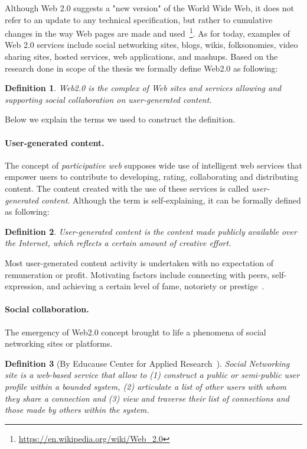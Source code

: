\documentclass[ngerman,UKenglish,table]{scrbook}
\newtheorem{definition}{Definition}
\begin{document}
Although Web 2.0 suggests a "new version" of the World Wide Web, it does not refer to an update to any technical specification, but rather to cumulative changes in the way Web pages are made and used~\footnote{\url{https://en.wikipedia.org/wiki/Web_2.0}}.
As for today, examples of Web 2.0 services include social networking sites, blogs, wikis, folksonomies, video sharing sites, hosted services, web applications, and mashups.
Based on the research done in scope of the thesis we formally define Web2.0 as following:
\begin{definition}
Web2.0 is the complex of Web sites and services allowing and supporting social collaboration on user-generated content.
\end{definition}

Below we explain the terms we used to construct the definition.

\paragraph{User-generated content.} 
The concept of \emph{participative web} supposes wide use of intelligent web services that empower users to contribute to developing, rating, collaborating and distributing content.
The content created with the use of these services is called \emph{user-generated content}. 
Although the term is self-explaining, it can be formally defined as following:
\begin{definition}User-generated content is the content made publicly available over the Internet, which reflects a certain amount of creative effort.
\end{definition}

Most user-generated content activity is undertaken with no expectation of
remuneration or profit.
Motivating factors include connecting with peers, self-expression, and achieving a certain level of fame, notoriety or prestige~\cite{Vickery:2007:PWU:1554640}.
 
\paragraph{Social collaboration.}
The emergency of Web2.0 concept brought to life a phenomena of social networking sites or platforms.

\begin{definition}[By Educause Center for Applied Research~\cite{educause}]
Social Networking site is a web-based service that allow to (1) construct a public or semi-public user profile within a bounded system, (2) articulate a list of other users with whom they share a connection and (3) view and traverse their list of connections and those made by others within the system.
\end{definition}
\end{document}
